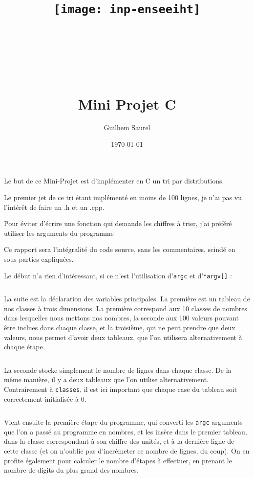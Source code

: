 \documentclass[10pt]{article}
\title{\texttt{[image: inp-enseeiht]} \\ ~ \\ ~ \\ ~ \\ ~ \\ Mini Projet C }
\author{Guilhem Saurel}
\date{\today}
\begin{document}
  \maketitle

 Le but de ce Mini-Projet est d'implémenter en C un tri par distributions.

 Le premier jet de ce tri étant implémenté en moins de 100 lignes, je n'ai pas vu l'intérêt de faire un .h et un .cpp.

 Pour éviter d'écrire une fonction qui demande les chiffres à trier, j'ai préféré utiliser les arguments du programme

 Ce rapport sera l'intégralité du code source, sans les commentaires, scindé en sous parties expliquées.

 Le début n'a rien d'intéressant, si ce n'est l'utilisation d'\verb|argc| et d'\verb|*argv[]| :

  \inputminted[linenos,lastline=7]{cpp}{../src/main.cpp}

  La suite est la déclaration des variables principales. La première est un tableau de nos classes à trois dimensions. La première correspond aux 10 classes de nombres dans lesquelles nous mettons nos nombres, la seconde aux 100 valeurs pouvant être inclues dans chaque classe, et la troisième, qui ne peut prendre que deux valeurs, nous permet d'avoir deux tableaux, que l'on utilisera alternativement à chaque étape.

  \inputminted[linenos,firstnumber=9,firstline=9,lastline=9]{cpp}{../src/main.cpp}

  La seconde stocke simplement le nombre de lignes dans chaque classe. De la même manière, il y a deux tableaux que l'on utilise alternativement. Contrairement à \verb|classes|, il est ici important que chaque case du tableau soit correctement initialisée à 0.

  \inputminted[linenos,firstnumber=10,firstline=10,lastline=14]{cpp}{../src/main.cpp}

  Vient ensuite la première étape du programme, qui converti les \verb|argc| arguments que l'on a passé au programme en nombres, et les insère dans le premier tableau, dans la classe correspondant à son chiffre des unités, et à la dernière ligne de cette classe (et on n'oublie pas d'incrémeter ce nombre de lignes, du coup). On en profite également pour calculer le nombre d'étapes à effectuer, en prenant le nombre de digits du plus grand des nombres.
\end{document}
